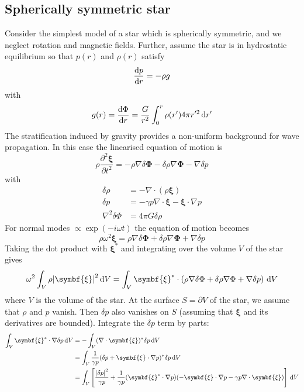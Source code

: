 \documentclass{jknotes}
\newcommand{\flux}{\symbf{\Phi}}
\newcommand{\disp}{\symbf{\xi}}
\begin{document}
\subsection{Spherically symmetric star}
Consider the simplest model of a star which is spherically symmetric, and we
neglect rotation and magnetic fields. Further, assume the star is in
hydrostatic equilibrium so that $p(r)$ and $\rho(r)$ satisfy
\begin{equation}
	\frac{\diffd p}{\diffd r} = -\rho g
\end{equation}
with
\begin{equation}
	g(r) = \frac{\diffd \Phi}{\diffd r} = \frac{G}{r^2} \int_0^r \rho(r') 4\pi
	r'^2 \, \diffd r'
\end{equation}
The stratification induced by gravity provides a non-uniform background for
wave propagation. In this case the linearised equation of motion is
\begin{equation}
	\rho \frac{\partial^2 \disp}{\partial t^2} = -\rho \nabla \delta \flux -
	\delta \rho \nabla \flux - \nabla \delta p
\end{equation}
with
\begin{align}
	\delta \rho &= -\nabla \cdot (\rho \disp) \\
	\delta p &= -\gamma p \nabla \cdot \disp - \disp \cdot \nabla p \\
	\nabla^2 \delta \Phi &= 4\pi G \delta \rho
\end{align}
For normal modes $\propto \exp(-i\omega t)$ the equation of motion becomes
\begin{equation}
	\rho \omega^2 \disp  = \rho \nabla \delta \flux +
	\delta \rho \nabla \flux + \nabla \delta p
\end{equation}
Taking the dot product with $\disp^*$ and integrating over the volume $V$ of
the star gives
\begin{equation}
	\omega^2 \int_V \rho \abs{\disp}^2 \, \diffd V = \int_V \disp^* \cdot
	\left( \rho \nabla \delta \Phi + \delta \rho \nabla \Phi + \nabla \delta p
	\right) \, \diffd V
\end{equation}
where $V$ is the volume of the star. At the surface $S = \partial V$ of the
star, we assume that $\rho$ and $p$ vanish. Then $\delta p$ also vanishes on
$S$ (assuming that $\disp$ and its derivatives are bounded). Integrate the
$\delta p$ term by parts:
\begin{align}
	\int_V \disp^* \cdot \nabla \delta p \, \diffd V 
	&= -\int_V (\nabla \cdot \disp)^* \delta p \, \diffd V \\
	&= \int_V \frac{1}{\gamma p} (\delta p + \disp \cdot \nabla p)^* \delta p
	\, \diffd V \\
	&= \int_V \left[ \frac{\abs{\delta p}^2}{\gamma p} + \frac{1}{\gamma p}
	(\disp^* \cdot \nabla p)(-\disp \cdot \nabla p - \gamma p \nabla \cdot
	\disp)\right] \, \diffd V
\end{align}
\end{document}
